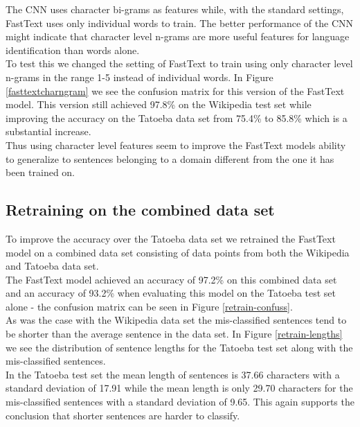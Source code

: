 The CNN uses character bi-grams as features while, with the standard settings, FastText uses only individual words to train. The better performance of the CNN might indicate that character level n-grams are more useful features for language identification than words alone.\\

To test this we changed the setting of FastText to train using only character level n-grams in the range 1-5 instead of individual words. In Figure \ref{fasttextcharngram} we see the confusion matrix for this version of the FastText model. This version still achieved 97.8\% on the Wikipedia test set while improving the accuracy on the Tatoeba data set from 75.4\% to 85.8\% which is a substantial increase.\\

Thus using character level features seem to improve the FastText models ability to generalize to sentences belonging to a domain different from the one it has been trained on.\\


\subsection{Retraining on the combined data set}
To improve the accuracy over the Tatoeba data set we retrained the FastText model on a combined data set consisting of data points from
both the Wikipedia and Tatoeba data set.\\

The FastText model achieved an accuracy of 97.2\% on this combined data set and an accuracy of 93.2\% when evaluating this model on the Tatoeba test set alone - the confusion matrix can be seen in Figure \ref{retrain-confuss}.\\

As was the case with the Wikipedia data set the mis-classified sentences tend to be shorter than the average sentence in the data set. In Figure \ref{retrain-lengths} we see the distribution of sentence lengths for the Tatoeba test set along with the mis-classified sentences.\\

In the Tatoeba test set the mean length of sentences is 37.66 characters with a standard deviation of 17.91 while the mean length is only 29.70 characters for the mis-classified sentences with a standard deviation of 9.65. This again supports the conclusion that shorter sentences are harder to classify.\\

